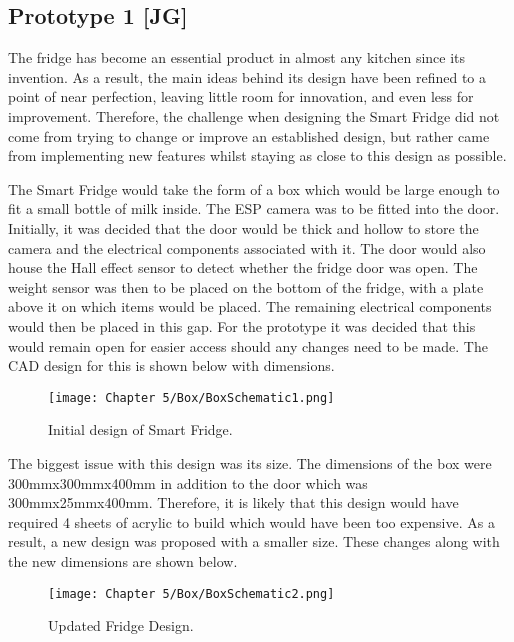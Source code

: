 \subsection{Prototype 1 [JG]}

The fridge has become an essential product in almost any kitchen since its invention.
As a result, the main ideas behind its design have been refined to a point of near perfection, leaving little room for innovation, and even less for improvement.
Therefore, the challenge when designing the Smart Fridge did not come from trying to change or improve an established design, but rather came from implementing new features whilst staying as close to this design as possible.

The Smart Fridge would take the form of a box which would be large enough to fit a small bottle of milk inside.
The ESP camera was to be fitted into the door.
Initially, it was decided that the door would be thick and hollow to store the camera and the electrical components associated with it.
The door would also house the Hall effect sensor to detect whether the fridge door was open.
The weight sensor was then to be placed on the bottom of the fridge, with a plate above it on which items would be placed.
The remaining electrical components would then be placed in this gap.
For the prototype it was decided that this would remain open for easier access should any changes need to be made.
The CAD design for this is shown below with dimensions.

\begin{figure}[H]        
    \centering
    \texttt{[image: Chapter 5/Box/BoxSchematic1.png]}
    \caption{Initial design of Smart Fridge.}
    \label{fig:initaldesign}
\end{figure} 

The biggest issue with this design was its size.
The dimensions of the box were 300mmx300mmx400mm in addition to the door which was 300mmx25mmx400mm.
 Therefore, it is likely that this design would have required 4 sheets of acrylic to build which would have been too expensive.
As a result, a new design was proposed with a smaller size.
These changes along with the new dimensions are shown below.

\begin{figure}[H]        
    \centering
    \texttt{[image: Chapter 5/Box/BoxSchematic2.png]}
    \caption{Updated Fridge Design.}
    \label{fig:updatedfridge}
\end{figure} 


